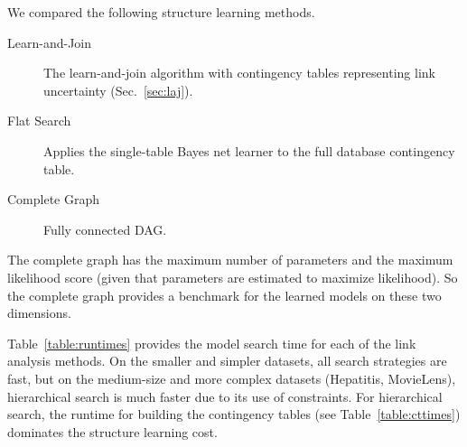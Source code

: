 \documentclass{vldb}
\begin{document}

We compared the following structure learning methods.

\begin{description}
\item[Learn-and-Join ] The learn-and-join algorithm with contingency tables representing link uncertainty (Sec.~\ref{sec:laj}).
\item[Flat Search]  Applies the single-table Bayes net learner to the full database contingency table.
\item[Complete Graph] Fully connected DAG.
\end{description}

The complete graph has the maximum number of parameters and the maximum likelihood score (given that parameters are estimated to maximize likelihood). So the complete graph provides a benchmark for the learned models on these two dimensions. 

Table~\ref{table:runtimes}
 provides the model search time for each of the link analysis methods. 
On the smaller and simpler datasets, all search strategies are fast, 
but on the medium-size and more complex datasets (Hepatitis, MovieLens), hierarchical search is much faster due to its use of constraints. For hierarchical search, the runtime for building the contingency tables (see Table~\ref{table:cttimes}) dominates the structure learning cost.
\end{document}
